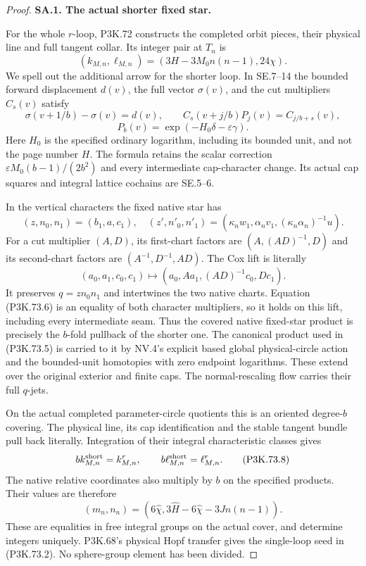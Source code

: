\begin{proof}
\par\medskip\noindent\textbf{SA.1. The actual shorter fixed star.}\par\nopagebreak[4]
For the whole \(r\)-loop, P3K.72 constructs the completed orbit
pieces, their physical line and full tangent collar. Its integer
pair at \(T_n\) is
\[
 (k_{M,n},\ell_{M,n})=
 (3H-3M_0n(n-1),24\chi).
 \tag{P3K.73.5}
\]
We spell out the additional arrow for the shorter loop. In SE.7--14
the bounded forward displacement \(d(v)\), the full vector
\(\sigma(v)\), and the cut multipliers \(C_s(v)\) satisfy
\[
 \sigma(v+1/b)-\sigma(v)=d(v),\qquad
 C_s(v+j/b)P_j(v)=C_{j/b+s}(v),
\]
\[
 P_b(v)=\exp(-H_0\delta-\varepsilon\gamma).
 \tag{P3K.73.6}
\]
Here \(H_0\) is the specified ordinary logarithm, including its
bounded unit, and not the page number \(H\). The formula retains
the scalar correction \(\varepsilon M_0(b-1)/(2b^2)\) and every
intermediate cap-character change. Its actual cap squares and
integral lattice cochains are SE.5--6.

In the vertical characters the fixed native star has
\[
 (z,n_0,n_1)=(b_1,a,c_1),\quad
 (z',n'_0,n'_1)=
 (\kappa_n w_1,\alpha_n v_1,(\kappa_n\alpha_n)^{-1}u).
\]
For a cut multiplier \((A,D)\), its first-chart factors are
\((A,(AD)^{-1},D)\) and its second-chart factors are
\((A^{-1},D^{-1},AD)\). The Cox lift is literally
\[
 (a_0,a_1,c_0,c_1)\longmapsto
 (a_0,Aa_1,(AD)^{-1}c_0,Dc_1).
 \tag{P3K.73.7}
\]
It preserves \(q=zn_0n_1\) and intertwines the two native charts.
Equation (P3K.73.6) is an equality of both character multipliers,
so it holds on this lift, including every intermediate seam.
Thus the covered native fixed-star product is precisely the
\(b\)-fold pullback of the shorter one. The canonical product
used in (P3K.73.5) is carried to it by NV.4's explicit based
global physical-circle action and the bounded-unit homotopies
with zero endpoint logarithms. These extend over the original
exterior and finite caps. The normal-rescaling flow carries their
full \(q\)-jets.

On the actual completed parameter-circle quotients this is an
oriented degree-\(b\) covering. The physical line, its cap
identification and the stable tangent bundle pull back literally.
Integration of their integral characteristic classes gives
\[
 b k_{M,n}^{\rm short}=k_{M,n}^{r},\qquad
 b\ell_{M,n}^{\rm short}=\ell_{M,n}^{r}.
 \tag{P3K.73.8}
\]
The native relative coordinates also multiply by \(b\) on the
specified products. Their values are therefore
\[
 (m_n,n_n)=
 (6\widehat\chi,
 3\widehat H-6\widehat\chi-3Jn(n-1)).
 \tag{P3K.73.9}
\]
These are equalities in free integral groups on the actual
cover, and determine integers uniquely. P3K.68's physical
Hopf transfer gives the single-loop seed in (P3K.73.2).
No sphere-group element has been divided.


\end{proof}
